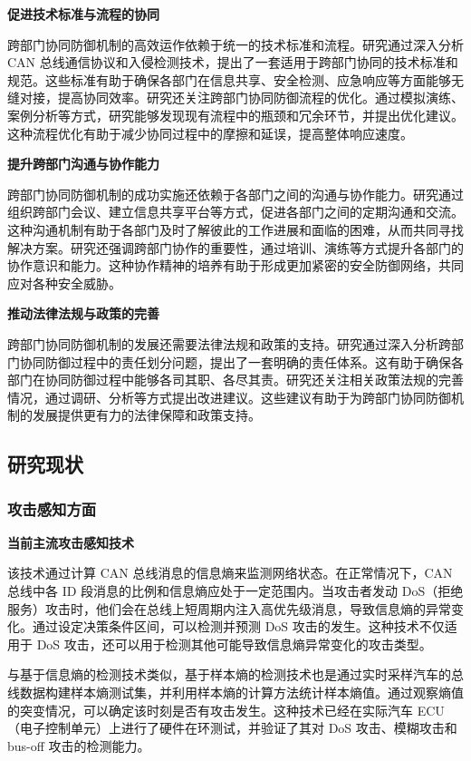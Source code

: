 \textbf{促进技术标准与流程的协同}

跨部门协同防御机制的高效运作依赖于统一的技术标准和流程。研究通过深入分析 CAN 总线通信协议和入侵检测技术，提出了一套适用于跨部门协同的技术标准和规范。这些标准有助于确保各部门在信息共享、安全检测、应急响应等方面能够无缝对接，提高协同效率。研究还关注跨部门协同防御流程的优化。通过模拟演练、案例分析等方式，研究能够发现现有流程中的瓶颈和冗余环节，并提出优化建议。这种流程优化有助于减少协同过程中的摩擦和延误，提高整体响应速度。

\textbf{提升跨部门沟通与协作能力}

跨部门协同防御机制的成功实施还依赖于各部门之间的沟通与协作能力。研究通过组织跨部门会议、建立信息共享平台等方式，促进各部门之间的定期沟通和交流。这种沟通机制有助于各部门及时了解彼此的工作进展和面临的困难，从而共同寻找解决方案。研究还强调跨部门协作的重要性，通过培训、演练等方式提升各部门的协作意识和能力。这种协作精神的培养有助于形成更加紧密的安全防御网络，共同应对各种安全威胁。

\textbf{推动法律法规与政策的完善}

跨部门协同防御机制的发展还需要法律法规和政策的支持。研究通过深入分析跨部门协同防御过程中的责任划分问题，提出了一套明确的责任体系。这有助于确保各部门在协同防御过程中能够各司其职、各尽其责。研究还关注相关政策法规的完善情况，通过调研、分析等方式提出改进建议。这些建议有助于为跨部门协同防御机制的发展提供更有力的法律保障和政策支持。

\subsection{研究现状}

\subsubsection{攻击感知方面}

\textbf{当前主流攻击感知技术}

该技术通过计算 CAN 总线消息的信息熵来监测网络状态。在正常情况下，CAN 总线中各 ID 段消息的比例和信息熵应处于一定范围内。当攻击者发动 DoS（拒绝服务）攻击时，他们会在总线上短周期内注入高优先级消息，导致信息熵的异常变化。通过设定决策条件区间，可以检测并预测 DoS 攻击的发生。这种技术不仅适用于 DoS 攻击，还可以用于检测其他可能导致信息熵异常变化的攻击类型。

与基于信息熵的检测技术类似，基于样本熵的检测技术也是通过实时采样汽车的总线数据构建样本熵测试集，并利用样本熵的计算方法统计样本熵值。通过观察熵值的突变情况，可以确定该时刻是否有攻击发生。这种技术已经在实际汽车 ECU（电子控制单元）上进行了硬件在环测试，并验证了其对 DoS 攻击、模糊攻击和 bus-off 攻击的检测能力。

